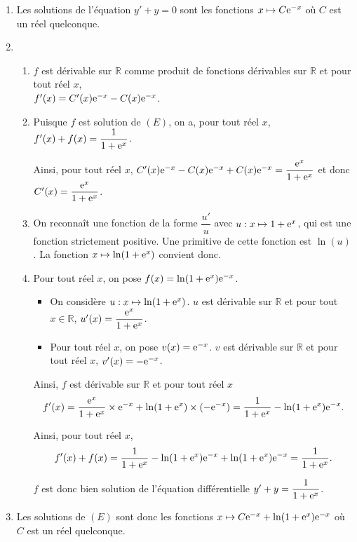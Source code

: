 \documentclass[11pt,fleqn, openany]{book} %
\begin{document}
\begin{solution} \hspace{0pt}
\begin{enumerate} \item Les solutions de l'équation \(y'+y=0\) sont les fonctions \(x\mapsto C\mathrm{e}^{-x}\) où \(C\) est un réel quelconque.
\item \begin{enumerate}\item  \(f\) est dérivable sur $\mathbb{R}$ comme produit de fonctions dérivables sur \(\mathbb{R}\) et pour tout réel \(x\), \\ \(f'(x)=C'(x)\mathrm{e}^{-x}-C(x)\mathrm{e}^{-x}\).
\item  Puisque \(f\) est solution de \((E)\), on a, pour tout réel \(x\), \(f'(x)+f(x)=\dfrac{1}{1+\mathrm{e}^x}\).

Ainsi, pour tout réel $x$, $C'(x)\mathrm{e}^{-x}-C(x)\mathrm{e}^{-x}+C(x)\mathrm{e}^{-x}=\dfrac{\mathrm{e}^x}{1+\mathrm{e}^x}$ et donc \(C'(x)=\dfrac{\mathrm{e}^x}{1+\mathrm{e}^x}\).
\item  On reconnaît une fonction de la forme \(\dfrac{u'}{u}\) avec \(u:x\mapsto 1+\mathrm{e}^x\), qui est une fonction strictement positive. Une primitive de cette fonction est \(\ln(u)\). La fonction \(x\mapsto \ln(1+\mathrm{e}^x)\) convient donc.
\item  Pour tout réel \(x\), on pose \(f(x)=\ln(1+\mathrm{e}^x)\mathrm{e}^{-x}\).
\begin{itemize}
\item  On considère \(u:x\mapsto \ln(1+\mathrm{e}^x)\). \(u\) est dérivable sur \(\mathbb{R}\) et pour tout \(x\in\mathbb{R}\), \(u'(x)=\dfrac{\mathrm{e}^x}{1+\mathrm{e}^x}\).
\item  Pour tout réel \(x\), on pose \(v(x)=\mathrm{e}^{-x}\). \(v\) est dérivable sur \(\mathbb{R}\) et pour tout réel \(x\), \(v'(x)=-\mathrm{e}^{-x}\).
\end{itemize}
Ainsi, \(f\) est dérivable sur \(\mathbb{R}\) et pour tout réel \(x\)
\[f'(x)=\dfrac{\mathrm{e}^x}{1+\mathrm{e}^x}\times \mathrm{e}^{-x}+\ln(1+\mathrm{e}^x)\times(-\mathrm{e}^{-x})=\dfrac{1}{1+\mathrm{e}^x}-\ln(1+\mathrm{e}^x)\mathrm{e}^{-x}.\]

Ainsi, pour tout réel \(x\),
\[f'(x)+f(x)=\dfrac{1}{1+\mathrm{e}^x}-\ln(1+\mathrm{e}^x)\mathrm{e}^{-x}+\ln(1+\mathrm{e}^x)\mathrm{e}^{-x}=\dfrac{1}{1+\mathrm{e}^x}.\]

\(f\) est donc bien solution de l'équation différentielle \(y'+y=\dfrac{1}{1+\mathrm{e}^x}\).
\end{enumerate}
\item  Les solutions de \((E)\) sont donc les fonctions \(x\mapsto C\mathrm{e}^{-x}+\ln(1+\mathrm{e}^x)\mathrm{e}^{-x}\) où \(C\) est un réel quelconque.\end{enumerate}
 \end{solution}
\end{document}
